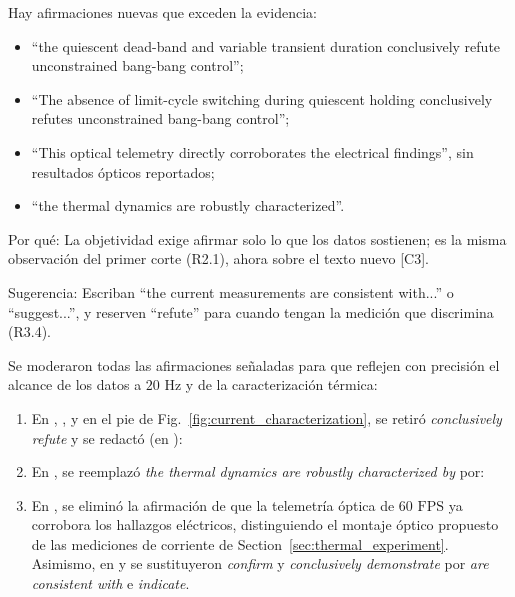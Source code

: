 \documentclass{LabDSTresponse}
\begin{document}
{Hay afirmaciones nuevas que exceden la evidencia:
\begin{itemize}
    \item “the quiescent dead-band and variable transient duration conclusively refute unconstrained bang-bang control”;
    \item “The absence of limit-cycle switching during quiescent holding conclusively refutes unconstrained bang-bang control”;
    \item “This optical telemetry directly corroborates the electrical findings”, sin resultados ópticos reportados;
    \item “the thermal dynamics are robustly characterized”.
\end{itemize}
Por qué: La objetividad exige afirmar solo lo que los datos sostienen; es la misma observación del primer corte (R2.1), ahora sobre el texto nuevo [C3].

Sugerencia: Escriban “the current measurements are consistent with...” o “suggest...”, y reserven “refute” para cuando tengan la medición que discrimina (R3.4).}
{Se moderaron todas las afirmaciones señaladas para que reflejen con precisión el alcance de los datos a $20\text{ Hz}$ y de la caracterización térmica:
\begin{enumerate}
    \item En , ,  y en el pie de Fig.~\ref{fig:current_characterization}, se retiró \textit{conclusively refute} y se redactó (en ):
    \item En , se reemplazó \textit{the thermal dynamics are robustly characterized by} por:
    \item En , se eliminó la afirmación de que la telemetría óptica de $60\text{ FPS}$ ya corrobora los hallazgos eléctricos, distinguiendo el montaje óptico propuesto de las mediciones de corriente de Section~\ref{sec:thermal_experiment}. Asimismo, en  y  se sustituyeron \textit{confirm} y \textit{conclusively demonstrate} por \textit{are consistent with} e \textit{indicate}.
\end{enumerate}}
\end{document}
